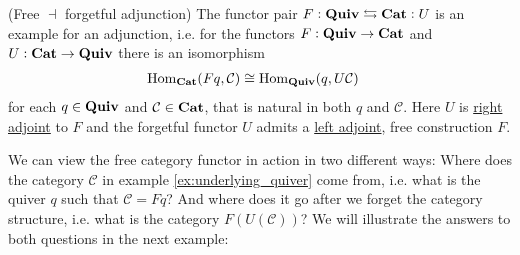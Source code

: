 \begin{definition}{(Free $\dashv$ forgetful adjunction)}
The functor pair $F : \mathrm{\textbf{Quiv}} \leftrightarrows \mathrm{\textbf{Cat}} : U$ is an example for an adjunction, i.e. for the functors $F : \mathrm{\textbf{Quiv}} \rightarrow \mathrm{\textbf{Cat}}$ and
$U : \mathrm{\textbf{Cat}} \rightarrow \mathrm{\textbf{Quiv}}$ there is an isomorphism
\begin{align}
\mathrm{Hom}_{\mathrm{\textbf{Cat}}}(Fq, \mathcal{C}) &\cong \mathrm{Hom}_{\mathrm{\textbf{Quiv}}}(q,U\mathcal{C})
\end{align}
for each $q \in \mathrm{\textbf{Quiv}}$ and $\mathcal{C} \in \mathrm{\textbf{Cat}}$, that is natural in both $q$ and $\mathcal{C}$. Here $U$ is \ul{right adjoint} to $F$ and
the forgetful functor $U$ admits a \ul{left adjoint}, free construction $F$.
\end{definition}

We can view the free category functor in action in two different ways: Where does the category $\mathcal{C}$ in example \ref{ex:underlying_quiver}
come from, i.e. what is the quiver $q$ such that $\mathcal{C} = Fq$? And where does it go after we forget the category structure, i.e. what is
the category $F(U(\mathcal{C}))$? We will illustrate the answers to both questions in the next example:

